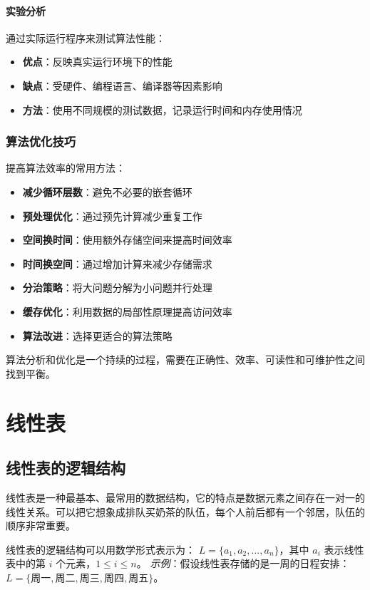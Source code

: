 \documentclass[lang=cn,newtx,10pt,scheme=chinese]{../elegantbook}
\begin{document}
\subsubsection{实验分析}
通过实际运行程序来测试算法性能：
\begin{itemize}
    \item \textbf{优点}：反映真实运行环境下的性能
    \item \textbf{缺点}：受硬件、编程语言、编译器等因素影响
    \item \textbf{方法}：使用不同规模的测试数据，记录运行时间和内存使用情况
\end{itemize}

\subsection{算法优化技巧}
提高算法效率的常用方法：

\begin{itemize}
    \item \textbf{减少循环层数}：避免不必要的嵌套循环
    \item \textbf{预处理优化}：通过预先计算减少重复工作
    \item \textbf{空间换时间}：使用额外存储空间来提高时间效率
    \item \textbf{时间换空间}：通过增加计算来减少存储需求
    \item \textbf{分治策略}：将大问题分解为小问题并行处理
    \item \textbf{缓存优化}：利用数据的局部性原理提高访问效率
    \item \textbf{算法改进}：选择更适合的算法策略
\end{itemize}

算法分析和优化是一个持续的过程，需要在正确性、效率、可读性和可维护性之间找到平衡。

\chapter{线性表}

\section{线性表的逻辑结构}
线性表是一种最基本、最常用的数据结构，它的特点是数据元素之间存在一对一的线性关系。可以把它想象成排队买奶茶的队伍，每个人前后都有一个邻居，队伍的顺序非常重要。

线性表的逻辑结构可以用数学形式表示为：
$L = \{a_1, a_2, \dots, a_n\}$，其中 $a_i$ 表示线性表中的第 $i$ 个元素，$1 \leq i \leq n$。
\textit{示例}：假设线性表存储的是一周的日程安排：
$L = \{\text{周一}, \text{周二}, \text{周三}, \text{周四}, \text{周五}\}$。
\end{document}
